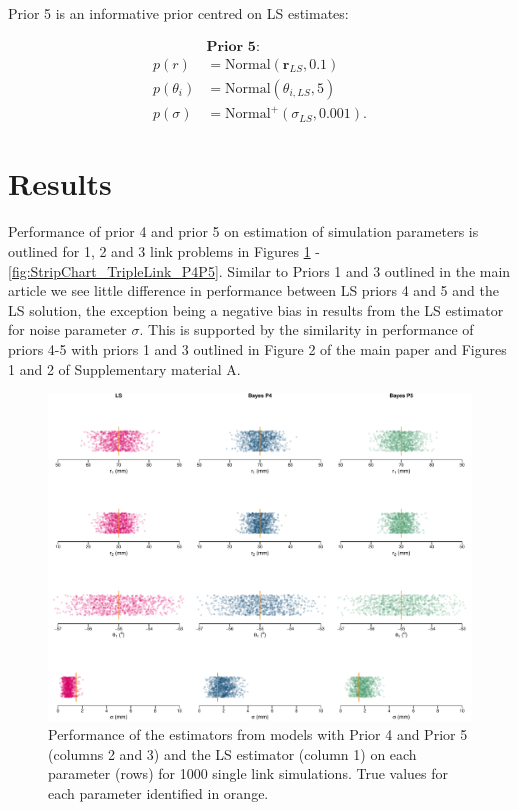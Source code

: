 \documentclass{article}
\begin{document}
Prior 5 is an informative prior centred on LS estimates:
\begin{linenomath}
	\begin{equation}
	\begin{split}
	&\textbf{Prior 5:}\\
	p(r) &= \text{Normal}\left(\bm{r}_{LS}, 0.1\right) \\
	p(\theta_i) &= \text{Normal}\left(\theta_{i, LS}, 5\right)\\
	p(\sigma) &=\text{Normal}^+\left(\sigma_{LS},0.001\right).
	\end{split} \label{eqn:P5}
	\end{equation}
\end{linenomath}

\section{Results}
Performance of prior 4 and prior 5 on estimation of simulation parameters is outlined for 1, 2 and 3 link problems in Figures \ref{fig:StripChart_SingleLink_P4P5} - \ref{fig:StripChart_TripleLink_P4P5}.  Similar to Priors 1 and 3 outlined in the main article we see little difference in performance between LS priors 4 and 5 and the LS solution, the exception being a negative bias in results from the LS estimator for noise parameter $\sigma$.  This is supported by the similarity in performance of priors 4-5 with priors 1 and 3 outlined in Figure 2 of the main paper and Figures 1 and 2 of Supplementary material A. 

\begin{figure}
	\centering
	\includegraphics[width=\textwidth]{./Figures/SingleLink_StripChartP4P5.pdf}
	\caption{Performance of the estimators from models with Prior 4 and Prior 5 (columns 2 and 3) and the LS estimator (column 1) on each parameter (rows) for 1000 single link simulations.  True values for each parameter identified in orange.}
	\label{fig:StripChart_SingleLink_P4P5}
\end{figure}
\end{document}
